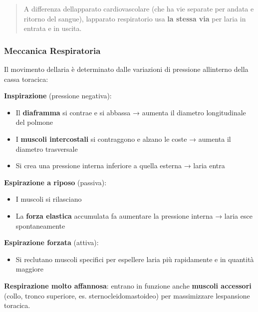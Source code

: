 \documentclass[a4paper,11pt]{article}
\providecommand{\tightlist}{%
  \setlength{\itemsep}{0pt}\setlength{\parskip}{0pt}}
\begin{document}
\begin{quote}
      A differenza dell\textquotesingle apparato cardiovascolare (che ha vie
      separate per andata e ritorno del sangue), l\textquotesingle apparato
      respiratorio usa \textbf{la stessa via} per l\textquotesingle aria in
      entrata e in uscita.
\end{quote}

\subsubsection{Meccanica Respiratoria}\label{meccanica-respiratoria}

Il movimento dell\textquotesingle aria è determinato dalle variazioni di
pressione all\textquotesingle interno della cassa toracica:

\textbf{Inspirazione} (pressione negativa):

\begin{itemize}
      \tightlist
      \item
            Il \textbf{diaframma} si contrae e si abbassa → aumenta il diametro
            longitudinale del polmone
      \item
            I \textbf{muscoli intercostali} si contraggono e alzano le coste →
            aumenta il diametro trasversale
      \item
            Si crea una pressione interna inferiore a quella esterna →
            l\textquotesingle aria entra
\end{itemize}

\textbf{Espirazione a riposo} (passiva):

\begin{itemize}
      \tightlist
      \item
            I muscoli si rilasciano
      \item
            La \textbf{forza elastica} accumulata fa aumentare la pressione
            interna → l\textquotesingle aria esce spontaneamente
\end{itemize}

\textbf{Espirazione forzata} (attiva):

\begin{itemize}
      \tightlist
      \item
            Si reclutano muscoli specifici per espellere l\textquotesingle aria
            più rapidamente e in quantità maggiore
\end{itemize}

\textbf{Respirazione molto affannosa}: entrano in funzione anche
\textbf{muscoli accessori} (collo, tronco superiore, es.
sternocleidomastoideo) per massimizzare l\textquotesingle espansione
toracica.
\end{document}
